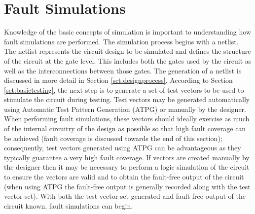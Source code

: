 \documentclass[12pt]{report}
\begin{document}
\section{Fault Simulations}
\label{sct:faultsim}
Knowledge of the basic concepts of simulation is important to understanding how fault simulations are performed.  The simulation process begins with a netlist.  The netlist represents the circuit design to be simulated and defines the structure of the circuit at the gate level.  This includes both the gates used by the circuit as well as the interconnections between those gates\cite{advancedverilog}.  The generation of a netlist is discussed in more detail in Section \ref{sct:designprocess}.  According to Section \ref{sct:basictesting}, the next step is to generate a set of test vectors to be used to stimulate the circuit during testing.  Test vectors may be generated automatically using Automatic Test Pattern Generation (ATPG)\cite{advancedverilog} or manually by the designer.  When performing fault simulations, these vectors should ideally exercise as much of the internal circuitry of the design as possible so that high fault coverage can be achieved (fault coverage is discussed towards the end of this section); consequently, test vectors generated using  ATPG can be advantageous as they typically guarantee a very high fault coverage\cite{advancedverilog}.  If vectors are created manually by the designer then it may be necessary to perform a logic simulation of the circuit to ensure the vectors are valid and to obtain the fault-free output of the circuit (when using ATPG the fault-free output is generally recorded along with the test vector set).  With both the test vector set generated and fault-free output of the circuit known, fault simulations can begin.  
\end{document}

